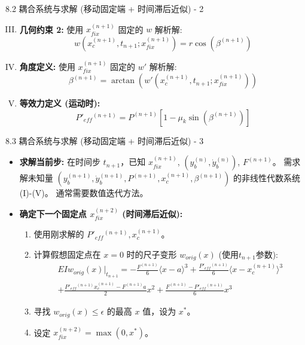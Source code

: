 \documentclass{beamer}
\begin{document}
\begin{frame}{8.2 耦合系统与求解 (移动固定端 + 时间滞后近似) - 2}
    \begin{enumerate}[(I)]
        \setcounter{enumi}{2} %
        \item \textbf{几何约束 2:} 使用 $x_{fix}^{(n+1)}$ 固定的 $w$ 解析解:
            \begin{equation*}
                w(x_c^{(n+1)}, t_{n+1}; x_{fix}^{(n+1)}) = r \cos(\beta^{(n+1)})
            \end{equation*}
        \item \textbf{角度定义:} 使用 $x_{fix}^{(n+1)}$ 固定的 $w'$ 解析解:
            \begin{equation*}
                \beta^{(n+1)} = \arctan( w'(x_c^{(n+1)}, t_{n+1}; x_{fix}^{(n+1)}) )
            \end{equation*}
        \item \textbf{等效力定义 (运动时):}
            \begin{equation*}
                \boxed{P'_{eff}{}^{(n+1)} = P^{(n+1)}[1 - \mu_k \sin(\beta^{(n+1)})]}
            \end{equation*}
    \end{enumerate}
\end{frame}

\begin{frame}{8.3 耦合系统与求解 (移动固定端 + 时间滞后近似) - 3}
    \begin{itemize}
        \item \textbf{求解当前步:}
        在时间步 $t_{n+1}$，已知 $x_{fix}^{(n+1)}$, $(y_b^{(n)}, \dot{y}_b^{(n)})$, $F^{(n+1)}$。
        需求解未知量 $(y_b^{(n+1)}, \dot{y}_b^{(n+1)}, P^{(n+1)}, x_c^{(n+1)}, \beta^{(n+1)})$ 的非线性代数系统 (I)-(V)。
        通常需要数值迭代方法。

        \item \textbf{确定下一个固定点 $x_{fix}^{(n+2)}$ (时间滞后近似):}
        \begin{enumerate}
            \item 使用刚求解的 $P'_{eff}{}^{(n+1)}, x_c^{(n+1)}$。
            \item 计算假想固定点在 $x=0$ 时的尺子变形 $w_{orig}(x)$ (使用$t_{n+1}$参数):
            \begin{multline*}
            \boxed{EI w_{orig}(x)|_{t_{n+1}} = -\frac{F^{(n+1)}}{6} \langle x-a \rangle^3 + \frac{P'_{eff}{}^{(n+1)}}{6} \langle x-x_c^{(n+1)} \rangle^3} \\
            \boxed{+ \frac{P'_{eff}{}^{(n+1)}x_c^{(n+1)} - F^{(n+1)}a}{2}x^2 + \frac{F^{(n+1)}-P'_{eff}{}^{(n+1)}}{6}x^3}
            \end{multline*}
            \item 寻找 $w_{orig}(x) \le \epsilon$ 的最高 $x$ 值，设为 $x^*$。
            \item 设定 $\boxed{x_{fix}^{(n+2)} = \max(0, x^*)}$。
        \end{enumerate}
    \end{itemize}
\end{frame}
\end{document}
